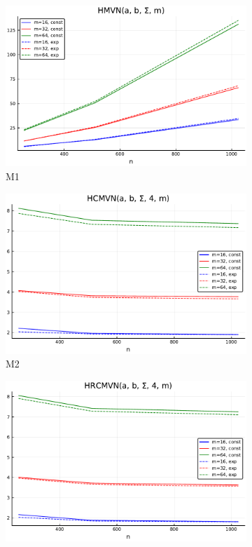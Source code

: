\begin{figure}[!h]
	\centering
			\begin{subfigure}[b]{0.3\textwidth}
					\centering
					\includegraphics[width=\linewidth]{figs/table3_m1.pdf}
					\caption{M1}
			\end{subfigure}\hfill
			\begin{subfigure}[b]{0.3\textwidth}
					\centering
					\includegraphics[width=\linewidth]{figs/table3_m2.pdf}
					\caption{M2}
			\end{subfigure}\hfill
			\begin{subfigure}[b]{0.3\textwidth}
					\centering
					\includegraphics[width=\linewidth]{figs/table3_m3.pdf}

\end{subfigure}
\end{figure}
